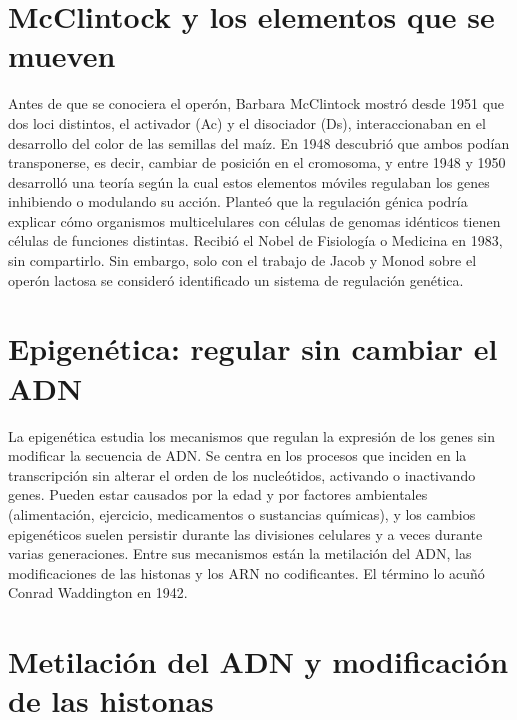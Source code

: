 \documentclass{book}
\begin{document}

\section{McClintock y los elementos que se mueven}

Antes de que se conociera el operón, Barbara McClintock mostró desde 1951 que dos loci distintos, el activador (Ac) y el disociador (Ds), interaccionaban en el desarrollo del color de las semillas del maíz. En 1948 descubrió que ambos podían transponerse, es decir, cambiar de posición en el cromosoma, y entre 1948 y 1950 desarrolló una teoría según la cual estos elementos móviles regulaban los genes inhibiendo o modulando su acción. Planteó que la regulación génica podría explicar cómo organismos multicelulares con células de genomas idénticos tienen células de funciones distintas. Recibió el Nobel de Fisiología o Medicina en 1983, sin compartirlo. Sin embargo, solo con el trabajo de Jacob y Monod sobre el operón lactosa se consideró identificado un sistema de regulación genética.


\section{Epigenética: regular sin cambiar el ADN}

La epigenética estudia los mecanismos que regulan la expresión de los genes sin modificar la secuencia de ADN. Se centra en los procesos que inciden en la transcripción sin alterar el orden de los nucleótidos, activando o inactivando genes. Pueden estar causados por la edad y por factores ambientales (alimentación, ejercicio, medicamentos o sustancias químicas), y los cambios epigenéticos suelen persistir durante las divisiones celulares y a veces durante varias generaciones. Entre sus mecanismos están la metilación del ADN, las modificaciones de las histonas y los ARN no codificantes. El término lo acuñó Conrad Waddington en 1942.


\section{Metilación del ADN y modificación de las histonas}
\end{document}
